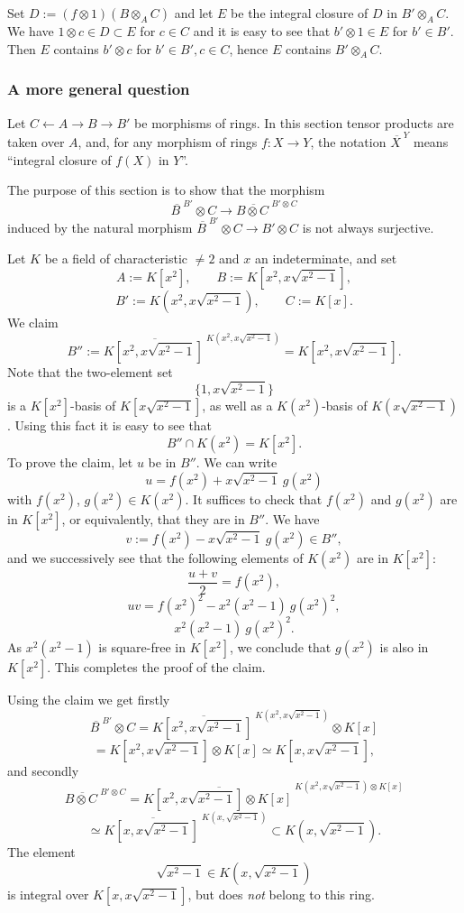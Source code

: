 \documentclass[parskip=half,fontsize=12pt]{scrartcl}%
\begin{document}
Set $D:=(f\otimes1)(B\otimes_AC)$ and let $E$ be the integral closure of $D$ in $B'\otimes_AC$. We have $1\otimes c\in D\subset E$ for $c\in C$ and it is easy to see that $b'\otimes1\in E$ for $b'\in B'$. Then $E$ contains $b'\otimes c$ for $b'\in B',c\in C$, hence $E$ contains $B'\otimes_AC$.

\subsubsection{A more general question}%

Let $C\leftarrow A\to B\to B'$ be morphisms of rings. In this section tensor products are taken over $A$, and, for any morphism of rings $f:X\to Y$, the notation $\overline{X\ }^Y$ means ``integral closure of $f(X)$ in $Y$''. 

The purpose of this section is to show that the morphism 
$$
\overline{B\ }^{B'}\otimes C\to\overline{B\otimes C\ }^{B'\otimes C}
$$ 
induced by the natural morphism $\overline{B\ }^{B'}\otimes C\to B'\otimes C$ is not always surjective. 

Let $K$ be a field of characteristic $\ne2$ and $x$ an indeterminate, and set 
$$
A:=K[x^2],\qquad B:=K\left[x^2,x\sqrt{x^2-1}\right],
$$
$$
B':=K\left(x^2,x\sqrt{x^2-1}\right),\qquad C:=K[x].
$$ 
We claim 
$$
B'':=\overline{K\left[x^2,x\sqrt{x^2-1}\right]\ }^{K\left(x^2,x\sqrt{x^2-1}\right)}=K\left[x^2,x\sqrt{x^2-1}\right].
$$ 
Note that the two-element set 
$$
\{1,x\sqrt{x^2-1}\}
$$ 
is a $K[x^2]$-basis of $K[x\sqrt{x^2-1}]$, as well as a $K(x^2)$-basis of $K(x\sqrt{x^2-1})$. Using this fact it is easy to see that 
$$
B''\cap K(x^2)=K[x^2].
$$ 
To prove the claim, let $u$ be in $B''$. We can write 
$$
u=f(x^2)+x\sqrt{x^2-1}\ g(x^2)
$$ 
with $f(x^2)$, $g(x^2)\in K(x^2)$. It suffices to check that $f(x^2)$ and $g(x^2)$ are in $K[x^2]$, or equivalently, that they are in $B''$. We have 
$$
v:=f(x^2)-x\sqrt{x^2-1}\ g(x^2)\in B'',
$$ 
and we successively see that the following elements of $K(x^2)$ are in $K[x^2]$: 
$$
\frac{u+v}2=f(x^2),
$$ 
$$
uv=f(x^2)^2-x^2(x^2-1)\ g(x^2)^2,
$$ 
$$
x^2(x^2-1)\ g(x^2)^2.
$$ 
As $x^2(x^2-1)$ is square-free in $K[x^2]$, we conclude that $g(x^2)$ is also in $K[x^2]$. This completes the proof of the claim. 

Using the claim we get firstly
$$
\overline{B\ }^{B'}\otimes C=\overline{K\left[x^2,x\sqrt{x^2-1}\right]\ }^{K\left(x^2,x\sqrt{x^2-1}\right)}\otimes K[x]
$$
$$
=K\left[x^2,x\sqrt{x^2-1}\right]\otimes K[x]\simeq K\left[x,x\sqrt{x^2-1}\right],
$$ 
and secondly 
$$ 
\overline{B\otimes C\ }^{B'\otimes C}=\overline{K\left[x^2,x\sqrt{x^2-1}\right]\otimes K[x]\ }^{K\left(x^2,x\sqrt{x^2-1}\right)\otimes K[x]}
$$
$$
\simeq\overline{K\left[x,x\sqrt{x^2-1}\right]\ }^{K\left(x,\sqrt{x^2-1}\right)}\subset K\left(x,\sqrt{x^2-1}\right).
$$ 
The element 
$$
\sqrt{x^2-1}\in K\left(x,\sqrt{x^2-1}\right)
$$ 
is integral over $K\left[x,x\sqrt{x^2-1}\right]$, but does \emph{not} belong to this ring.
\end{document}
